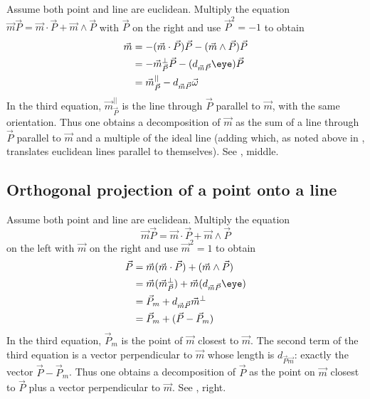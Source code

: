 \documentclass[12pt]{article}
\begin{document}
Assume both point and line are euclidean.
Multiply the equation $\vec{m}\vec{P} = \vec{m}\cdot \vec{P} + \vec{m} \wedge \vec{P}$ with $\vec{P}$ on the right and use $\vec{P}^{2}=-1$ to obtain 
\begin{align*}
\vec{m} &= -(\vec{m} \cdot \vec{P})\vec{P} - (\vec{m} \wedge \vec{P}) \vec{P} \\
&= -\vec{m}^{\perp}_{\vec{P}}\vec{P} - (d_{\vec{m}\vec{P}}\eye) \vec{P} \\
&= \vec{m}^{||}_{\vec{P}} - d_{\vec{m}\vec{P}} \vec{\omega} \\
\end{align*}
In the third equation, $\vec{m}^{||}_{\vec{P}}$ is the line through $\vec{P}$ parallel to $\vec{m}$, with the same orientation.  Thus one obtains a decomposition of $\vec{m}$ as the sum of a line through $\vec{P}$ parallel to $\vec{m}$ and a multiple of the ideal line (adding which, as noted above in , translates euclidean lines parallel to themselves). See , middle.

\vspace{-.05in}

\subsection{Orthogonal projection of a point onto a line}

Assume both point and line are euclidean.
Multiply the equation \[\vec{m}\vec{P} = \vec{m}\cdot \vec{P} + \vec{m} \wedge \vec{P}\] on the left with $\vec{m}$ on the right and use $\vec{m}^{2}=1$ to obtain 
\begin{align*}
\vec{P} &=  \vec{m}(\vec{m} \cdot \vec{P})+ (\vec{m} \wedge \vec{P}) \\
&= \vec{m} (\vec{m}^{\perp}_{\vec{P}})+  \vec{m}(d_{\vec{m}\vec{P}}\eye) \\
&= \vec{P}_{m} + d_{\vec{m}\vec{P}}\vec{m}^{\perp} \\
&= \vec{P}_{m} + (\vec{P} - \vec{P}_{m})
\end{align*}
In the third equation, $\vec{P}_{m}$ is the point of $\vec{m}$ closest to $\vec{m}$.  The second term of the third equation is a vector perpendicular to $\vec{m}$ whose length is $d_{\vec{P}\vec{m}}$:  exactly the vector $\vec{P} - \vec{P}_{m}$.
 Thus one obtains a decomposition of $\vec{P}$ as the point on $\vec{m}$ closest to $\vec{P}$   plus a vector perpendicular to $\vec{m}$. See , right.
\end{document}
